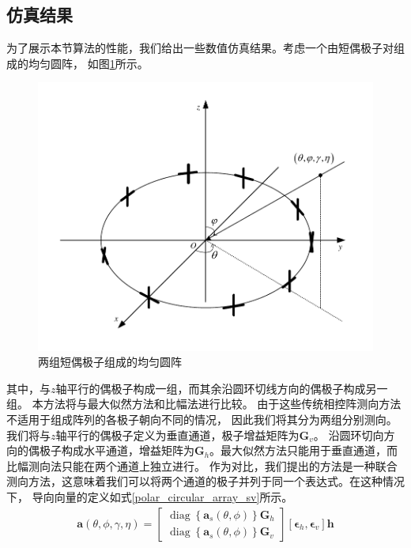\documentclass[master]{thesis-uestc}
\begin{document}
\subsection{仿真结果}
为了展示本节算法的性能，我们给出一些数值仿真结果。考虑一个由短偶极子对组成的均匀圆阵，
如图\ref{polar_circular_array}所示。
\begin{figure}[h]
    \includegraphics[scale=0.8]{pic/circular_array.pdf}
    \caption{两组短偶极子组成的均匀圆阵}
    \label{polar_circular_array}
\end{figure}
其中，与$z$轴平行的偶极子构成一组，而其余沿圆环切线方向的偶极子构成另一组。
本方法将与最大似然方法和比幅法进行比较。
由于这些传统相控阵测向方法不适用于组成阵列的各极子朝向不同的情况，
因此我们将其分为两组分别测向。我们将与$z$轴平行的偶极子定义为垂直通道，极子增益矩阵为$\bm{G}_v$。
沿圆环切向方向的偶极子构成水平通道，增益矩阵为$\bm{G}_h$。最大似然方法只能用于垂直通道，而比幅测向法只能在两个通道上独立进行。
作为对比，我们提出的方法是一种联合测向方法，这意味着我们可以将两个通道的极子并列于同一个表达式。在这种情况下，
导向向量的定义如式\eqref{polar_circular_array_sv}所示。
\begin{equation}\label{polar_circular_array_sv}
    \begin{aligned}
        \bm{a}(\theta,\phi,\gamma,\eta) = 
        \begin{bmatrix}
            \operatorname{diag}\left\{\bm{a}_s(\theta,\phi)\right\}\bm{G}_h \\
            \operatorname{diag}\left\{\bm{a}_s(\theta,\phi)\right\}\bm{G}_v
        \end{bmatrix}
        \left[\bm{\epsilon}_h,\bm{\epsilon}_v\right]\bm{h}
    \end{aligned}
\end{equation}
\end{document}
